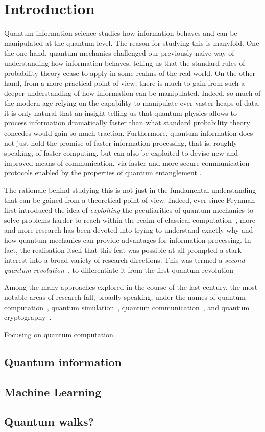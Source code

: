 \chapter{Introduction}

Quantum information science studies how information behaves and can be manipulated at the quantum level.
The reason for studying this is manyfold. One the one hand, quantum mechanics challenged our previously naive way of understanding how information behaves, telling us that the standard rules of probability theory cease to apply in some realms of the real world.
On the other hand, from a more practical point of view, there is much to gain from such a deeper understanding of how information can be manipulated. Indeed, so much of the modern age relying on the capability to manipulate ever vaster heaps of data, it is only natural that an insight telling us that quantum physics allows to process information dramatically faster than what standard probability theory concedes would gain so much traction.
Furthermore, quantum information does not just hold the promise of faster information processing, that is, roughly speaking, of faster computing, but can also be exploited to devise new and improved means of communication, via faster and more secure communication protocols enabled by the properties of quantum entanglement .

The rationale behind studying this is not just in the fundamental understanding that can be gained from a theoretical point of view. Indeed, ever since Feynman first introduced the idea of \emph{exploiting} the peculiarities of quantum mechanics to solve problems harder to reach within the realm of classical computation~\cite{feynman1982simulating}, more and more research has been devoted into trying to understand exactly why and how quantum mechanics can provide advantages for information processing.
In fact, the realisation itself that this feat was possible at all prompted a stark interest into a broad variety of research directions. This was termed a \textit{second quantum revolution}~\cite{dowling2003quantum}, to differentiate it from the first quantum revolution 

Among the many approaches explored in the course of the last century, the most notable areas of research fall, broadly speaking, under the names of quantum computation~\cite{shor1997polynomial}, quantum simulation~\cite{lloyd1996universal}, quantum communication~\cite{bennett1993teleporting}, and quantum cryptography~\cite{bennett2014quantum}.

Focusing on quantum computation.


\section{Quantum information}

\section{Machine Learning}

\section{Quantum walks?}
